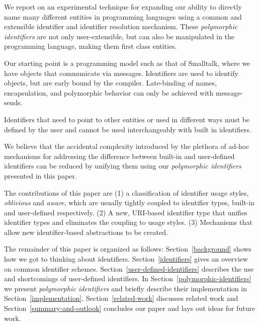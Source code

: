 \documentclass[preprint,authoryear]{acm_proc_article-sp}
\begin{document}
We report on an experimental
technique for expanding our ability to directly name many different 
entities
in programming languages using a common and extensible identifier and identifier resolution
mechanism.
These \emph{polymorphic identifiers} are not only user-extensible,
but can also be manipulated in the programming language, making them first class 
entities.

Our starting point is a programming model such as that of Smalltalk, where we have objects
that communicate via messages\cite{Goldberg1983}.   Identifiers are used to identify 
objects, but are early bound by the compiler.  Late-binding of names, encapsulation,
and polymorphic behavior can only be achieved with message-sends.


Identifiers that need to point to other entities or used in different ways must be defined
by the user and cannot be used interchangeably with built in identifiers.  

We believe that the accidental complexity introduced by the
plethora of ad-hoc mechanisms for addressing the difference between built-in 
and user-defined identifiers can be reduced 
by unifying them using our \emph{polymorphic identifiers} presented in this paper.

The contributions of this paper are (1) a classification of identifier usage styles, {\em oblivious}
and {\em aware}, which
are usually tightly coupled to identifier types, built-in and user-defined respectively.
(2) A new, URI-based identifier type
that unifies identifier types and eliminates the coupling to usage styles. (3) Mechanisms
that allow new identifier-based abstractions to be created.


The remainder of this paper is organized as follows: 
Section~\ref{background}  shows how we got to thinking about identifiers.
Section~\ref{identifiers} gives an overview on common identifier schemes.
Section~\ref{user-defined-identifiers} describes the use and shortcomings of user-defined identifiers.
In Section~\ref{polymorphic-identifiers} we present \emph{polymorphic identifiers} and briefly describe their implementation in Section~\ref{implementation}.
Section~\ref{related-work} discusses related work and Section~\ref{summary-and-outlook} concludes our paper and lays out ideas for future work.
\end{document}
